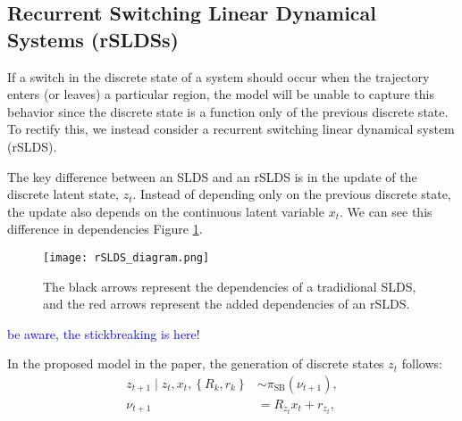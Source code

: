 
\subsection{Recurrent Switching Linear Dynamical Systems (rSLDSs)}

If a switch in the discrete state of a system should occur when the trajectory enters (or leaves) a particular region, the model will be unable to capture this behavior since the discrete state is a function only of the previous discrete state. To rectify this, we instead consider a recurrent switching linear dynamical system (rSLDS). 

The key difference between an SLDS and an rSLDS is in the update of the  discrete latent state, $z_t$. Instead of depending only on the previous discrete state, the update also depends on the continuous latent variable $x_t$. We can see this difference in dependencies Figure \ref{rSLDS}.

\begin{figure}[h!]
	\centering
	\texttt{[image: rSLDS\_diagram.png]}
	\caption{The black arrows represent the dependencies of a tradidional SLDS, and the red arrows represent the added dependencies of an rSLDS.}
	\label{rSLDS}
\end{figure}

\textcolor{blue}{be aware, the stickbreaking is here!}

In the proposed model in the paper, the generation of discrete states $z_{t}$ follows:
$$
\begin{aligned}
z_{t+1} \mid z_{t}, x_{t},\left\{R_{k}, r_{k}\right\} & \sim \pi_{\mathrm{SB}}\left(\nu_{t+1}\right), \\
\nu_{t+1} & =R_{z_{t}} x_{t}+r_{z_{t}},
\end{aligned}
$$

